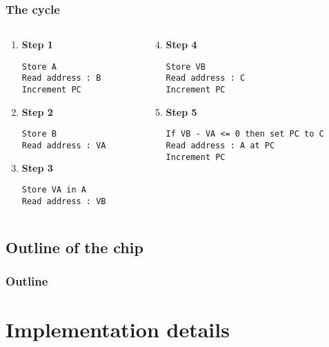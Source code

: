 \documentclass{beamer}
\begin{document}
\begin{frame}[fragile]
    \frametitle{The cycle}
\begin{columns}[t]
	\begin{column}[T]{4cm}
    \begin{enumerate}
      \setcounter{enumi}{0}
        \item \textbf{Step 1}
          \begin{verbatim}
Store A
Read address : B
Increment PC
          \end{verbatim}
        \item \textbf{Step 2}
          \begin{verbatim}
Store B
Read address : VA
          \end{verbatim}
        \item \textbf{Step 3}
	        \begin{verbatim}
Store VA in A
Read address : VB
          \end{verbatim}
  	\end{enumerate}
	\end{column}
	\begin{column}[T]{7cm}
  	\begin{enumerate}
  	  \setcounter{enumi}{3}
  	    \item \textbf{Step 4}
  	      \begin{verbatim}
Store VB
Read address : C
Increment PC
  	      \end{verbatim}
  	    \item \textbf{Step 5}
  	      \begin{verbatim}
If VB - VA <= 0 then set PC to C
Read address : A at PC
Increment PC
  	      \end{verbatim}
  	\end{enumerate}
	\end{column}
\end{columns}

\end{frame}

\subsection{Outline of the chip}
\begin{frame}
    \frametitle{Outline}
    \centering
    
\end{frame}

\section{Implementation details}
\end{document}
